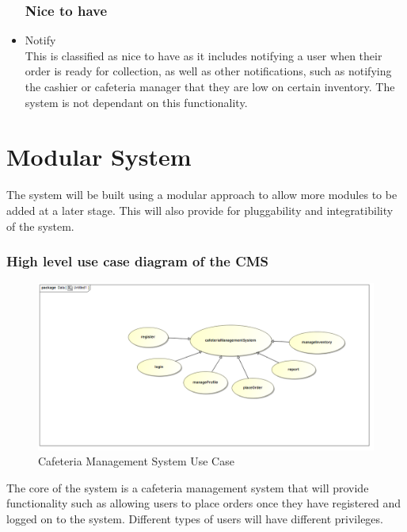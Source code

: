 \documentclass[a4paper,12pt]{article}
\begin{document}
\begin{itemize}
\subsubsection{Nice to have}
\item Notify \\
This is classified as nice to have as it includes notifying a user when their order is ready for collection, as well as other notifications, such as notifying the cashier or cafeteria manager that they are low on certain inventory.  The system is not dependant on this functionality.

\end{itemize}

\section{Modular System}
The system will be built using a modular approach to allow more modules to be added at a later stage. This will also provide for pluggability and integratibility of the system.

\subsubsection{High level use case diagram of the CMS}
\begin{figure}[H]
  \centering
    \includegraphics[width=1.0\textwidth]{images/CMSUseCase.png}
    \caption{Cafeteria Management System Use Case} 
\end{figure}
The core of the system is a cafeteria management system that will provide functionality such as allowing users to place orders once they have registered and logged on to the system. Different types of users will have different privileges. 
\end{document}
